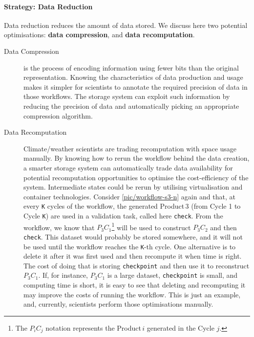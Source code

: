 \documentclass{superfri}
\begin{document}
\paragraph{Strategy: Data Reduction}

Data reduction reduces the amount of data stored.
We discuss here two potential optimisations: \textbf{data compression}, and \textbf{data recomputation}.

\begin{description}

\item[Data Compression] is the process of encoding information using fewer bits than the original representation.
Knowing the characteristics of data production and usage makes it simpler for scientists to annotate the required precision of data in those workflows.
The storage system can exploit such information by reducing the precision of data and automatically picking an appropriate compression algorithm.

\item[Data Recomputation] Climate/weather scientists are trading recomputation with space usage manually.
By knowing how to rerun the workflow behind the data creation, a smarter storage system can automatically trade data availability for potential recomputation opportunities to optimise the cost-efficiency of the system.
Intermediate states could be rerun by utilising virtualisation and container technologies.
Consider \cref{pic/workflow-s3-n} again and that, at every \texttt{K} cycles of the workflow, the generated Product\,3 (from Cycle 1 to Cycle \texttt{K}) are used in a validation task, called here \texttt{check}.
From the workflow, we know that $P_3 C_1$\footnote{The $P_i C_j$ notation represents the Product\,$i$ generated in the Cycle $j$.} will be used to construct $P_3 C_2$ and then \texttt{check}.
This dataset would probably be stored somewhere, and it will not be used until the workflow reaches the \texttt{K}-th cycle.
One alternative is to delete it after it was first used and then recompute it when time is right.
The cost of doing that is storing \texttt{checkpoint} and then use it to reconstruct $P_3 C_1$.
If, for instance, $P_3 C_1$ is a large dataset, \texttt{checkpoint} is small, and computing time is short, it is easy to see that deleting and recomputing it may improve the costs of running the workflow.
This is just an example, and, currently, scientists perform those optimisations manually.
\end{description}
\end{document}
